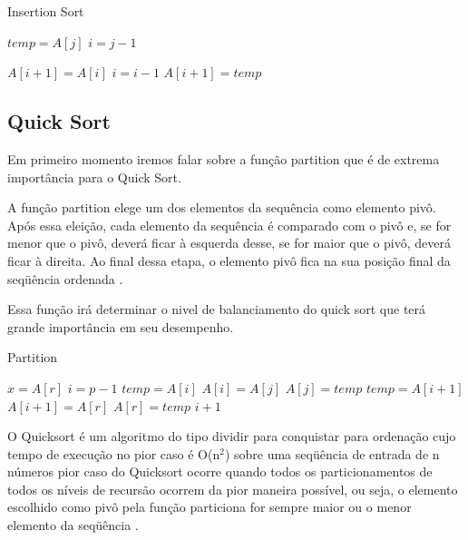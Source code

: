 \documentclass[12pt]{article}
\let\oldReturn\Return
\renewcommand{\Return}{\State\oldReturn}
\begin{document}
	\begin{algorithm}[H]
		\caption{Insertion Sort}
		\begin{algorithmic}[1]

					\State $temp = A[j]$	
					\State $i = j - 1$		
										
					\While{$ ( i > 0 ) $ \And $ ( A[i] > temp ) $} 
						\State$A[i + 1] = A[i]$
						\State$i = i - 1 $
					\EndWhile
					\State$A[i + 1] = temp$				
				\EndFor
				
				
			\EndFunction
			
			
		\end{algorithmic}
	\end{algorithm}




\subsection{Quick Sort}

	Em primeiro momento iremos falar sobre a função partition que é de extrema importância para o Quick Sort. 
	
	A  função partition elege  um  dos  elementos  da  sequência  como  elemento
pivô.   Após  essa eleição, cada elemento da sequência é comparado com o pivô e, se for menor que o pivô, deverá ficar à esquerda desse,  se for maior que o pivô,  deverá ficar à direita.   Ao final dessa etapa,  o elemento pivô fica na sua posição final da seqüência ordenada \cite{prado2005analise}. 
	
	Essa função irá determinar o nivel de balanciamento do quick sort que terá grande importância em seu desempenho.
	
	
	
	\begin{algorithm}[H]
		\caption{Partition}
		\begin{algorithmic}[1]	
			\Function{partition}{$A, p, r$}		
				\State $x = A[r] $	
				\State $i = p - 1$
				\For{$j = p$  \To $r - 1$ }
					\If{$A[j] <= x $}
						\State$temp = A[i]$
						\State$A[i] = A[j]$
						\State$A[j] = temp$
					\EndIf
				\EndFor
				\State$temp = A[i + 1]$
				\State$A[i + 1] = A[r]$
				\State$A[r] = temp$
				\Return $i + 1$
			\EndFunction
			\end{algorithmic}
	\end{algorithm}
	
	
	
	O Quicksort é um algoritmo do tipo dividir para conquistar para ordenação cujo tempo de
execução  no  pior  caso  é O(n$^2$) sobre  uma  seqüência  de  entrada  de n números pior caso do Quicksort ocorre quando todos os particionamentos de todos os níveis de recursão ocorrem da pior maneira possível, ou seja, o elemento escolhido como pivô pela função particiona for sempre maior ou o menor elemento da seqüência \cite{prado2005analise}.
\end{document}

